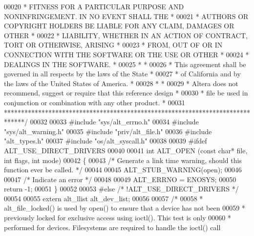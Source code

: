 \begin{DoxyCode}
00020 \textcolor{comment}{* FITNESS FOR A PARTICULAR PURPOSE AND NONINFRINGEMENT. IN NO EVENT SHALL THE *}
00021 \textcolor{comment}{* AUTHORS OR COPYRIGHT HOLDERS BE LIABLE FOR ANY CLAIM, DAMAGES OR OTHER      *}
00022 \textcolor{comment}{* LIABILITY, WHETHER IN AN ACTION OF CONTRACT, TORT OR OTHERWISE, ARISING     *}
00023 \textcolor{comment}{* FROM, OUT OF OR IN CONNECTION WITH THE SOFTWARE OR THE USE OR OTHER         *}
00024 \textcolor{comment}{* DEALINGS IN THE SOFTWARE.                                                   *}
00025 \textcolor{comment}{*                                                                             *}
00026 \textcolor{comment}{* This agreement shall be governed in all respects by the laws of the State   *}
00027 \textcolor{comment}{* of California and by the laws of the United States of America.              *}
00028 \textcolor{comment}{*                                                                             *}
00029 \textcolor{comment}{* Altera does not recommend, suggest or require that this reference design    *}
00030 \textcolor{comment}{* file be used in conjunction or combination with any other product.          *}
00031 \textcolor{comment}{******************************************************************************/}
00032 
00033 \textcolor{preprocessor}{#include "sys/alt_errno.h"}
00034 \textcolor{preprocessor}{#include "sys/alt_warning.h"}
00035 \textcolor{preprocessor}{#include "priv/alt_file.h"}
00036 \textcolor{preprocessor}{#include "alt_types.h"}
00037 \textcolor{preprocessor}{#include "os/alt_syscall.h"}
00038 
00039 \textcolor{preprocessor}{#ifdef ALT\_USE\_DIRECT\_DRIVERS}
00040 
00041 \textcolor{keywordtype}{int} ALT_OPEN (\textcolor{keyword}{const} \textcolor{keywordtype}{char}* file, \textcolor{keywordtype}{int} flags, \textcolor{keywordtype}{int} mode)
00042 \{
00043   \textcolor{comment}{/* Generate a link time warning, should this function ever be called. */}
00044   
00045   ALT_STUB_WARNING(open);
00046   
00047   \textcolor{comment}{/* Indicate an error */}
00048   
00049   ALT_ERRNO = ENOSYS;
00050   \textcolor{keywordflow}{return} -1;
00051 \}
00052 
00053 \textcolor{preprocessor}{#else }\textcolor{comment}{/* !ALT\_USE\_DIRECT\_DRIVERS */}\textcolor{preprocessor}{}
00054 
00055 \textcolor{keyword}{extern} alt_llist alt_dev_list;
00056 
00057 \textcolor{comment}{/*}
00058 \textcolor{comment}{ * alt\_file\_locked() is used by open() to ensure that a device has not been}
00059 \textcolor{comment}{ * previously locked for exclusive access using ioctl(). This test is only}
00060 \textcolor{comment}{ * performed for devices. Filesystems are required to handle the ioctl() call}

\end{DoxyCode}
